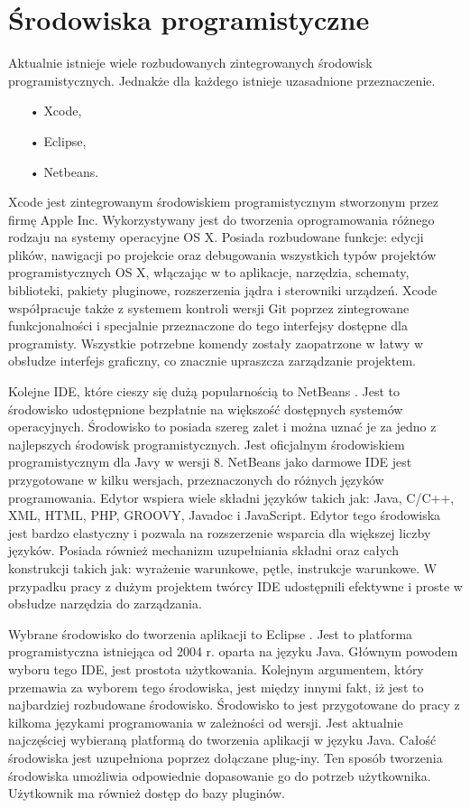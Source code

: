 \section{{Środowiska programistyczne}}

Aktualnie istnieje wiele rozbudowanych zintegrowanych środowisk programistycznych. Jednakże dla każdego istnieje uzasadnione przeznaczenie.

\begin{itemize}
\item[•]{Xcode,}
\item[•]{Eclipse,}
\item[•]{Netbeans.}
\end{itemize}


Xcode \cite{Xcode} jest zintegrowanym środowiskiem programistycznym stworzonym przez firmę Apple Inc. Wykorzystywany jest do tworzenia oprogramowania różnego rodzaju na systemy operacyjne OS X. Posiada rozbudowane funkcje: edycji plików, nawigacji po projekcie oraz  debugowania wszystkich typów projektów programistycznych OS X, włączając w to aplikacje, narzędzia, schematy, biblioteki, pakiety pluginowe, rozszerzenia jądra i sterowniki urządzeń. Xcode współpracuje także z systemem kontroli wersji Git poprzez zintegrowane funkcjonalności i specjalnie przeznaczone do tego interfejsy dostępne dla programisty. Wszystkie potrzebne komendy zostały zaopatrzone w łatwy w obsłudze interfejs graficzny, co znacznie upraszcza zarządzanie projektem.


Kolejne IDE, które cieszy się dużą popularnością to NetBeans \cite{netbeans}. Jest to środowisko udostępnione bezpłatnie na większość dostępnych systemów operacyjnych. Środowisko to posiada szereg zalet i można uznać je za jedno z najlepszych środowisk programistycznych. Jest oficjalnym środowiskiem programistycznym dla Javy w wersji 8. NetBeans jako darmowe IDE jest przygotowane w kilku wersjach, przeznaczonych do różnych języków programowania. Edytor wspiera wiele składni języków takich jak:  Java, C/C++, XML, HTML, PHP, GROOVY, Javadoc i JavaScript. Edytor tego środowiska jest bardzo elastyczny i pozwala na rozszerzenie wsparcia dla większej liczby języków. Posiada również mechanizm uzupełniania składni oraz całych konstrukcji takich jak: wyrażenie warunkowe, pętle, instrukcje warunkowe. W przypadku pracy z dużym projektem  twórcy IDE udostępnili efektywne i proste w obsłudze narzędzia do zarządzania.


Wybrane środowisko do tworzenia aplikacji to Eclipse \cite{eclipse}. Jest to platforma programistyczna istniejąca od 2004 r. oparta na języku Java. Głównym powodem wyboru tego IDE, jest prostota użytkowania. Kolejnym argumentem, który przemawia za wyborem tego środowiska, jest między innymi fakt, iż jest to najbardziej rozbudowane środowisko. Środowisko to jest przygotowane do pracy z kilkoma językami programowania w zależności od wersji. Jest aktualnie najczęściej wybieraną platformą do tworzenia aplikacji w języku Java. Całość środowiska jest uzupełniona poprzez dołączane plug-iny.  Ten sposób tworzenia środowiska umożliwia odpowiednie dopasowanie go do potrzeb użytkownika. Użytkownik ma również dostęp do bazy pluginów.


